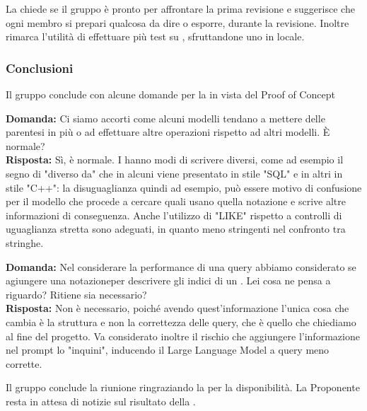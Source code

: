\par La chiede se il gruppo è pronto per affrontare la prima revisione e suggerisce che ogni membro si prepari qualcosa da dire o esporre, durante la revisione. Inoltre rimarca l'utilità di effettuare più test su , sfruttandone uno in locale.

\subsubsection{Conclusioni}
\par Il gruppo conclude con alcune domande per la  in vista del Proof of Concept

\par \textbf{Domanda:} Ci siamo accorti come alcuni modelli tendano a mettere delle parentesi in più o ad effettuare altre operazioni rispetto ad altri modelli. È normale? \\
\textbf{Risposta:} Sì, è normale. I  hanno modi di scrivere diversi, come ad esempio il segno di "diverso da" che in alcuni viene presentato in stile "SQL" e in altri in stile "C++": la disuguaglianza quindi ad esempio, può essere motivo di confusione per il modello che procede a cercare quali  usano quella notazione e scrive altre informazioni di conseguenza. Anche l'utilizzo di "LIKE" rispetto a controlli di uguaglianza stretta sono adeguati, in quanto meno stringenti nel confronto tra stringhe.

\par \textbf{Domanda:} Nel considerare la performance di una query abbiamo considerato se agiungere una notazioneper descrivere gli indici di un . Lei cosa ne pensa a riguardo? Ritiene sia necessario? \\
\textbf{Risposta:} Non è necessario, poiché avendo quest'informazione l'unica cosa che cambia è la struttura e non la correttezza delle query, che è quello che chiediamo al fine del progetto. Va considerato inoltre il rischio che aggiungere l'informazione nel prompt lo "inquini", inducendo il Large Language Model a query meno corrette.

\par Il gruppo conclude la riunione ringraziando la  per la disponibilità. La Proponente resta in attesa di notizie sul risultato della \RTB.